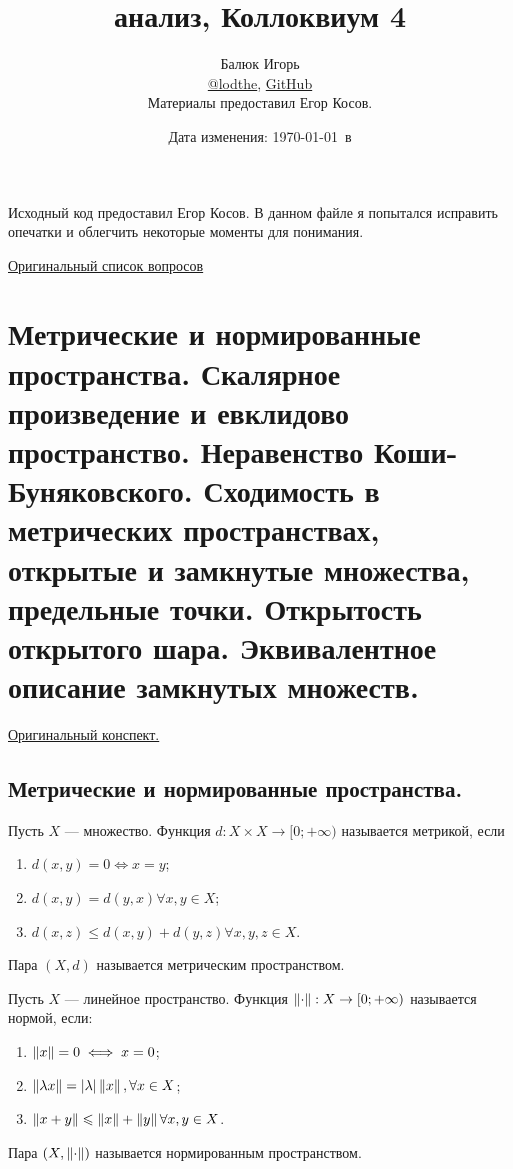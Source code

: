 \documentclass[a4paper]{article}
\title{\HugeМатематический анализ, Коллоквиум 4}
\author{
	Балюк Игорь \\
	\href{https://teleg.run/lodthe}{@lodthe},
    \href{https://github.com/LoDThe/hse-tex}{GitHub} \\
    Материалы предоставил Егор Косов.
}
\date{Дата изменения: \today \ в \currenttime}
\theoremstyle{named}
\begin{document}
    \maketitle

    \tableofcontents

    \newpage

    Исходный код предоставил Егор Косов. В данном файле я попытался исправить опечатки и облегчить некоторые моменты для понимания.

    \href{https://www.dropbox.com/s/fwquqpjo0hnrwn9/%D0%9F%D1%80%D0%BE%D0%B3%D1%80%D0%B0%D0%BC%D0%BC%D0%B0%20%D0%BA%D0%BE%D0%BB%D0%BB%D0%BE%D0%BA%D0%B2%D0%B8%D1%83%D0%BC%D0%B0%20%D0%9C%D0%90-2-2.pdf?dl=0}{Оригинальный список вопросов}

    \section{Метрические и нормированные пространства. Скалярное произведение и евклидово пространство. Неравенство Коши-Буняковского. Сходимость в метрических пространствах, открытые и замкнутые множества, предельные точки. Открытость открытого шара. Эквивалентное описание замкнутых множеств.}

    \href{https://www.dropbox.com/s/donysz87em9jfhs/%D0%9B%D0%B5%D0%BA%D1%86%D0%B8%D1%8F%208.pdf?dl=0}{Оригинальный конспект.}

    \subsection{Метрические и нормированные пространства.}

    \begin{definition*}
        Пусть $X$ --- множество. Функция $d: X \times X \to [0; +\infty)$ называется метрикой, если
        \begin{enumerate}
        \item $d(x, y) = 0 \iff x = y$;
        \item $d(x, y) = d(y, x) \forall x, y \in X$;
        \item $d(x, z) \leq d(x, y) + d(y, z) \forall x, y, z \in X$.
        \end{enumerate}

        Пара $(X, d)$ называется метрическим пространством.
    \end{definition*}

    \begin{definition*}
        Пусть $X$ --- линейное пространство. Функция $\left\lVert\cdot\right\rVert: X \to [0; +\infty)$ называется нормой, если:
        \begin{enumerate}
        \item $\left\lVert x\right\rVert = 0 \iff x = 0$;
        \item $\left\lVert\lambda x\right\rVert = |\lambda| \left\lVert x\right\rVert, \forall x \in X$;
        \item $\left\lVert x + y\right\rVert \leqslant \left\lVert x\right\rVert + \left\lVert y\right\rVert \forall x, y \in X$.
        \end{enumerate}

        Пара $(X, \left\lVert\cdot\right\rVert)$ называется нормированным пространством.
    \end{definition*}
\end{document}
